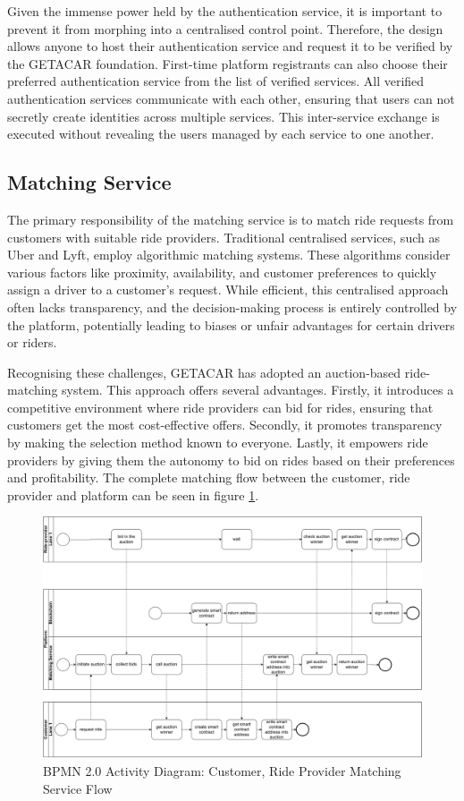 Given the immense power held by the authentication service, it is important to prevent it from morphing into a centralised control point. Therefore, the design allows anyone to host their authentication service and request it to be verified by the GETACAR foundation. First-time platform registrants can also choose their preferred authentication service from the list of verified services. All verified authentication services communicate with each other, ensuring that users can  not secretly create identities across multiple services. This inter-service exchange is executed without revealing the users managed by each service to one another. 

\subsection{Matching Service}\label{subsec:MatchingService}
The primary responsibility of the matching service is to match ride requests from customers with suitable ride providers. Traditional centralised services, such as Uber and Lyft, employ algorithmic matching systems. These algorithms consider various factors like proximity, availability, and customer preferences to quickly assign a driver to a customer's request. While efficient, this centralised approach often lacks transparency, and the decision-making process is entirely controlled by the platform, potentially leading to biases or unfair advantages for certain drivers or riders.

Recognising these challenges, GETACAR has adopted an auction-based ride-matching system. This approach offers several advantages. Firstly, it introduces a competitive environment where ride providers can bid for rides, ensuring that customers get the most cost-effective offers. Secondly, it promotes transparency by making the selection method known to everyone. Lastly, it empowers ride providers by giving them the autonomy to bid on rides based on their preferences and profitability. The complete matching flow between the customer, ride provider and platform can be seen in figure \ref{fig:maching}.

\begin{figure}[h]
    \centering
    \includegraphics[width=\linewidth]{data/5.svg}
    \caption{BPMN 2.0 Activity Diagram: Customer, Ride Provider Matching Service Flow}
    \label{fig:maching}
\end{figure}


